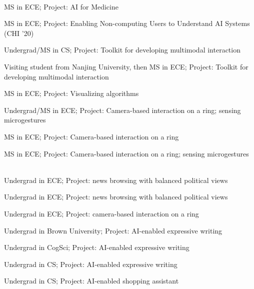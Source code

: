 ~\\

 {
	 {
		MS in ECE; Project: AI for Medicine
	}
}

 {
	 {
		MS in ECE; Project: Enabling Non-computing Users to Understand AI Systems (CHI '20)
	}
}

 {
	 {
		Undergrad/MS in CS;
		Project: Toolkit for developing multimodal interaction
	}
}

 {
	 {
		Visiting student from Nanjing University, then MS in ECE;
		Project: Toolkit for developing multimodal interaction
	}
}

 {
	 {
		MS in ECE; Project: Visualizing algorithms
	}
}

 {
	 {
		Undergrad/MS in ECE;
		Project: Camera-based interaction on a ring; sensing microgestures
	}
}

 {
	 {
		MS in ECE;
		Project: Camera-based interaction on a ring
	}
}

 {
	 {
		MS in ECE;
		Project: Camera-based interaction on a ring; sensing microgestures
	}
}

~\\

 {
	 {
		Undergrad in ECE; Project: news browsing with balanced political views
	}
}

 {
	 {
		Undergrad in ECE; Project: news browsing with balanced political views
	}
}

 {
	 {
		Undergrad in ECE; Project: camera-based interaction on a ring
	}
}

 {
	 {
		Undergrad in Brown University; Project: AI-enabled expressive writing	
	}
}

 {
	 {
		Undergrad in CogSci; Project: AI-enabled expressive writing	
	}
}

 {
	 {
		Undergrad in CS; Project: AI-enabled expressive writing	
	}
}

 {
	 {
		Undergrad in CS; Project: AI-enabled shopping assistant
	}
}

